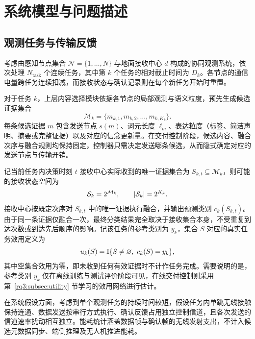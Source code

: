 \section{系统模型与问题描述}
\label{rq3:sec:model}

\subsection{观测任务与传输反馈}
\label{rq3:subsec:tasks}
\label{rq3:subsec:channel}
\label{rq3:subsec:feedback}

考虑由感知节点集合 $\mathcal N=\{1,\ldots,N\}$ 与地面接收中心 $d$ 构成的协同观测系统，依次处理 $N_{\mathrm{task}}$ 个连续任务，其中第 $k$ 个任务的相对截止时间为 $D_k$。各节点的通信电量跨任务连续扣减，而接收状态与确认记录则在每个新任务开始时重置。

对于任务 $k$，上层内容选择模块依据各节点的局部观测与语义粒度，预先生成候选证据集合
\begin{equation}
  \mathcal{M}_k=\{m_{k,1},m_{k,2},\ldots,m_{k,K_k}\}.
  \label{rq3:eq:candidates}
\end{equation}
每条候选证据 $m$ 包含发送节点 $s(m)$、词元长度 $\ell_m$、表达粒度（标签、简洁声明、摘要或完整证据）以及对应的信念更新量。在交付控制阶段，候选内容、融合次序与融合规则均保持固定，控制器只需决定发送哪条候选，从而隐式确定对应的发送节点与传输开销。

记当前任务内决策时刻 $t$ 接收中心实际收到的唯一证据集合为 $S_{k,t}\subseteq\mathcal{M}_k$，则可能的接收状态空间为
\begin{equation}
  \mathcal{S}_k=2^{\mathcal{M}_k},\qquad |\mathcal{S}_k|=2^{K_k}.
  \label{rq3:eq:state-space}
\end{equation}
接收中心按既定次序对 $S_{k,t}$ 中的唯一证据执行融合，并输出预测类别 $c_k(S_{k,t})$。由于同一条证据仅融合一次，最终分类结果完全取决于接收集合本身，不受重复到达次数或到达先后顺序的影响。记该任务的参考类别为 $y_k$，集合 $S$ 对应的真实任务效用定义为
\begin{equation}
  u_k(S)=\mathbb{I}\{S\ne\varnothing,\ c_k(S)=y_k\},
  \label{rq3:eq:true-utility}
\end{equation}
其中空集合效用为零，即未收到任何有效证据时不计作任务完成。需要说明的是，参考类别 $y_k$ 仅在离线训练与测试评价阶段可见，在线交付控制则采用第~\ref{rq3:subsec:utility} 节学习的效用网络进行估计。

在系统假设方面，考虑到单个观测任务的持续时间较短，假设任务内单跳无线接触保持连通、数据发送按串行方式执行、确认反馈占用独立控制信道，且各次发送的信道速率扰动相互独立。能耗统计涵盖数据帧与确认帧的无线发射支出，不计入候选元数据同步、端侧推理及无人机推进能耗。

